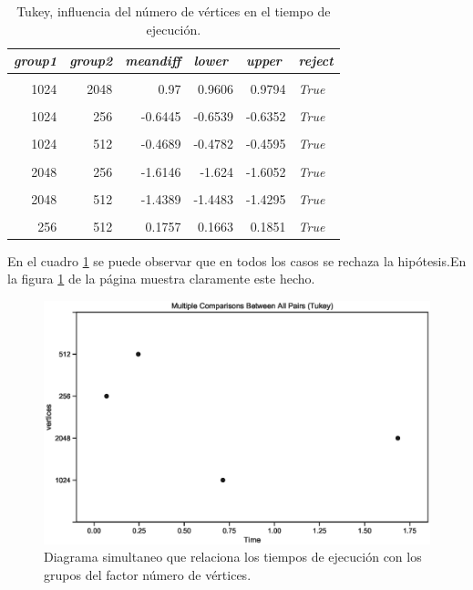 \documentclass{article}
\begin{document}
\begin{table}[htbp]
  \centering
  \caption{Tukey, influencia del número de vértices en el tiempo de ejecución.}
    \begin{tabular}{rrrrrl}
    \toprule
    \multicolumn{1}{l}{\textit{\textbf{group1}}} & \multicolumn{1}{l}{\textit{\textbf{group2}}} & \multicolumn{1}{l}{\textit{\textbf{meandiff}}} & \multicolumn{1}{l}{\textit{\textbf{lower}}} & \multicolumn{1}{l}{\textit{\textbf{upper}}} & \textit{\textbf{reject}} \\
    \midrule
          &       &       &       &       &  \\
    1024  & 2048  & 0.97  & 0.9606 & 0.9794 & \textit{True} \\
          &       &       &       &       &  \\
    1024  & 256   & -0.6445 & -0.6539 & -0.6352 & \textit{True} \\
          &       &       &       &       &  \\
    1024  & 512   & -0.4689 & -0.4782 & -0.4595 & \textit{True} \\
          &       &       &       &       &  \\
    2048  & 256   & -1.6146 & -1.624 & -1.6052 & \textit{True} \\
          &       &       &       &       &  \\
    2048  & 512   & -1.4389 & -1.4483 & -1.4295 & \textit{True} \\
          &       &       &       &       &  \\
    256   & 512   & 0.1757 & 0.1663 & 0.1851 & \textit{True} \\
    \bottomrule
    \end{tabular}%
  \label{tab:t5}%
\end{table}%

En el cuadro \ref{tab:t5} se puede observar que en todos los casos se rechaza la hipótesis.En la figura \ref{fig7} de la página \pageref{fig7} muestra claramente este hecho.
\begin{center}
\begin{figure}[htbp]
\includegraphics[scale=0.6]{simultaneoustukeyvertices.eps}
\caption{Diagrama simultaneo que relaciona los tiempos de ejecución con los grupos del factor número de vértices.}
\label{fig7}
\end{figure}
\end{center}
\end{document}
